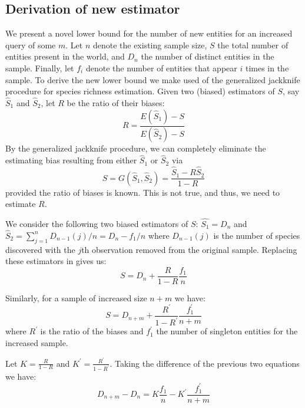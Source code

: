 \documentclass{vldb}
\begin{document}
\begin{appendix}
\section{Derivation of new estimator}
We present a novel lower bound for the number of new entities for an increased query of some $m$. Let $n$ denote the existing sample size, $S$ the total number of entities present in the world, and $D_n$ the number of distinct entities in the sample. Finally, let $f_i$ denote the number of entities that appear $i$ times in the sample. To derive the new lower bound we make used of the generalized jackknife procedure for species richness estimation. Given two (biased) estimators of $S$, say $\hat{S}_1$ and $\hat{S}_2$, let $R$ be the ratio of their biases:
\begin{equation}
R = \frac{E(\hat{S}_1) - S}{E(\hat{S}_2) - S}
\end{equation}
By the generalized jackknife procedure, we can completely eliminate the estimating bias resulting from either $\hat{S}_1$ or $\hat{S}_2$ via
\begin{equation}
S = G(\hat{S}_1, \hat{S}_2) = \frac{\hat{S}_1 - R\hat{S}_2}{1 - R}
\label{eq:jknife}
\end{equation}
provided the ratio of biases is known. This is not true, and thus, we need to estimate $R$. 

We consider the following two biased estimators of $S$: $\hat{S_1} = D_n$ and $\hat{S}_2 = \sum_{j=1}^n D_{n-1}(j)/n = D_n - f_1/n$ where $D_{n-1}(j)$ is the number of species discovered with the $j$th observation removed from the original sample. Replacing these estimators in  gives us:
\begin{equation}
S = D_n +\frac{R}{1-R}\frac{f_1}{n}
\end{equation}

Similarly, for a sample of increased size $n+m$ we have:
\begin{equation}
S = D_{n+m} +\frac{R^{\prime}}{1-R^{\prime}}\frac{f^{\prime}_1}{n+m}
\end{equation}
where $R^{\prime}$ is the ratio of the biases and $f^{\prime}_1$ the number of singleton entities for the increased sample.

Let $K = \frac{R}{1-R}$ and $K^{\prime} = \frac{R^{\prime}}{1-R^{\prime}}$. Taking the difference of the previous two equations we have:
\begin{equation}
D_{n+m} - D_{n} = K\frac{f_1}{n} - K^{\prime}\frac{f^{\prime}_1}{n+m}
\end{equation}


\end{appendix}
\end{document}
